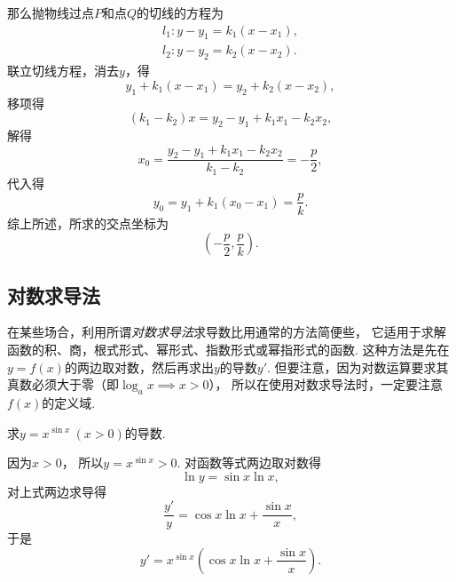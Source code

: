\begin{example}
\begin{solution}
那么抛物线过点\(P\)和点\(Q\)的切线的方程为\begin{gather*}
	l_1: y-y_1 = k_1 (x-x_1), \\
	l_2: y-y_2 = k_2 (x-x_2).
\end{gather*}
联立切线方程，消去\(y\)，得\begin{equation*}
	y_1 + k_1(x - x_1) = y_2 + k_2(x - x_2),
\end{equation*}
移项得\begin{equation*}
	(k_1 - k_2) x = y_2 - y_1 + k_1 x_1 - k_2 x_2,
\end{equation*}
解得\begin{equation*}
	x_0 = \frac{y_2 - y_1 + k_1 x_1 - k_2 x_2}{k_1 - k_2}
	= -\frac{p}{2},
\end{equation*}
代入得\begin{equation*}
	y_0 = y_1 + k_1(x_0 - x_1)
	= \frac{p}{k}.
\end{equation*}
综上所述，所求的交点坐标为\begin{equation*}
	\left(-\frac{p}{2},\frac{p}{k}\right).
\end{equation*}
\end{solution}
\end{example}

\subsection{对数求导法}
在某些场合，利用所谓\emph{对数求导法}求导数比用通常的方法简便些，
它适用于求解函数的积、商，根式形式、幂形式、指数形式或幂指形式的函数.
这种方法是先在\(y=f(x)\)的两边取对数，然后再求出\(y\)的导数\(y'\).
但要注意，因为对数运算要求其真数必须大于零（即\(\log_a x \implies x>0\)），
所以在使用对数求导法时，一定要注意\(f(x)\)的定义域.

\begin{example}
求\(y=x^{\sin x}\ (x>0)\)的导数.
\begin{solution}
因为\(x > 0\)，
所以\(y=x^{\sin x} > 0\).
对函数等式两边取对数得\begin{equation*}
	\ln y = \sin x \ln x,
\end{equation*}
对上式两边求导得\begin{equation*}
	\frac{y'}{y} = \cos x \ln x + \frac{\sin x}{x},
\end{equation*}
于是\begin{equation*}
	y' = x^{\sin x} \left( \cos x \ln x + \frac{\sin x}{x} \right).
\end{equation*}
\end{solution}
\end{example}


